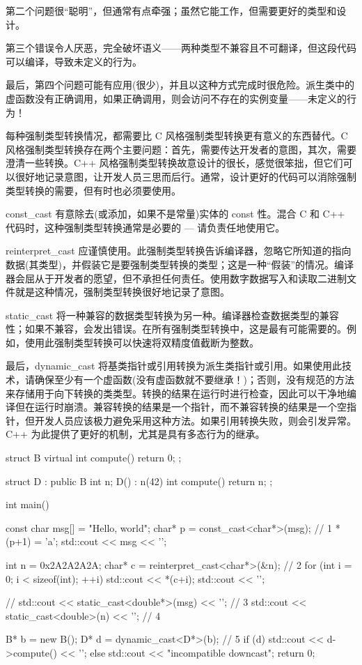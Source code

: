 第二个问题很“聪明”，但通常有点牵强；虽然它能工作，但需要更好的类型和设计。

第三个错误令人厌恶，完全破坏语义——两种类型不兼容且不可翻译，但这段代码可以编译，导致未定义的行为。

最后，第四个问题可能有应用(很少)，并且以这种方式完成时很危险。派生类中的虚函数没有正确调用，如果正确调用，则会访问不存在的实例变量——未定义的行为！


每种强制类型转换情况，都需要比 C 风格强制类型转换更有意义的东西替代。C 风格强制类型转换存在两个主要问题：首先，需要传达开发者的意图，其次，需要澄清一些转换。C++ 风格强制类型转换故意设计的很长，感觉很笨拙，但它们可以很好地记录意图，让开发人员三思而后行。通常，设计更好的代码可以消除强制类型转换的需要，但有时也必须要使用。

const\_cast 有意除去(或添加，如果不是常量)实体的 const 性。混合 C 和 C++ 代码时，这种强制类型转换通常是必要的 — 请负责任地使用它。

reinterpret\_cast 应谨慎使用。此强制类型转换告诉编译器，忽略它所知道的指向数据(其类型)，并假装它是要强制类型转换的类型；这是一种“假装”的情况。编译器会屈从于开发者的愿望，但不承担任何责任。使用数字数据写入和读取二进制文件就是这种情况，强制类型转换很好地记录了意图。

static\_cast 将一种兼容的数据类型转换为另一种。编译器检查数据类型的兼容性；如果不兼容，会发出错误。在所有强制类型转换中，这是最有可能需要的。例如，使用此强制类型转换可以快速将双精度值截断为整数。

最后，dynamic\_cast 将基类指针或引用转换为派生类指针或引用。如果使用此技术，请确保至少有一个虚函数(没有虚函数就不要继承！)；否则，没有规范的方法来存储用于向下转换的类类型。转换的结果在运行时进行检查，因此可以干净地编译但在运行时崩溃。兼容转换的结果是一个指针，而不兼容转换的结果是一个空指针，但开发人员应该极力避免采用这种方法。如果引用转换失败，则会引发异常。C++ 为此提供了更好的机制，尤其是具有多态行为的继承。


\begin{cpp}
struct B {
  virtual int compute() { return 0; }
};

struct D : public B {
  int n;
  D() : n(42) {}
  int compute() { return n; }
};

int main() {
  const char msg[] = "Hello, world";
  char* p = const_cast<char*>(msg); // 1
  *(p+1) = 'a';
  std::cout << msg << '\n';

  int n = 0x2A2A2A2A;
  char* c = reinterpret_cast<char*>(&n); // 2
  for (int i = 0; i < sizeof(int); ++i)
    std::cout << *(c+i);
  std::cout << '\n';

  // std::cout << static_cast<double*>(msg) << '\n'; // 3
  std::cout << static_cast<double>(n) << '\n'; // 4

  B* b = new B();
  D* d = dynamic_cast<D*>(b); // 5
  if (d)
    std::cout << d->compute() << '\n';
  else
    std::cout << "incompatible downcast\n";
  return 0;
}
\end{cpp}

